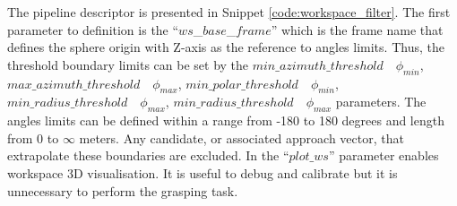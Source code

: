 \begin{figure}[h!] %
\end{figure}

The pipeline descriptor is presented in Snippet \ref{code:workspace_filter}. The first parameter to definition is the ``$ws$\_$base$\_$frame$'' which is the frame name that defines the sphere origin with Z-axis as the reference to angles limits. Thus, the threshold boundary limits can be set by the $min\_azimuth\_threshold \quad \phi_{min}$, $max\_azimuth\_threshold \quad \phi_{max}$, $min\_polar\_threshold \quad \phi_{min}$, $min\_radius\_threshold \quad \phi_{max}$, $min\_radius\_threshold \quad \phi_{max}$ parameters. The angles limits can be defined within a range from -180 to 180 degrees and length from 0 to $\infty$ meters. Any candidate, or associated approach vector, that extrapolate these boundaries are excluded. In the ``$plot\_ws$'' parameter enables workspace 3D visualisation. It is useful to debug and calibrate but it is unnecessary to perform the grasping task.





